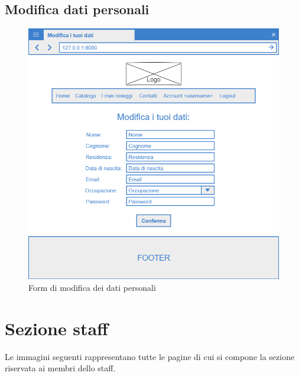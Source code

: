 \documentclass[12pt,a4paperS]{report}
\begin{document}
\begin{normalsize}
			\subsection{Modifica dati personali}
				\begin{figure}[H]
					\centering
					\includegraphics[width=1\textwidth, height=1\textheight, keepaspectratio]{Mockup/Modifica_dati.png}
					\caption{Form di modifica dei dati personali}
				\end{figure}
			
		\newpage
		\section{Sezione staff}
			Le immagini seguenti rappresentano tutte le pagine di cui si compone la sezione riservata ai membri dello staff.
			

\end{normalsize}
\end{document}
